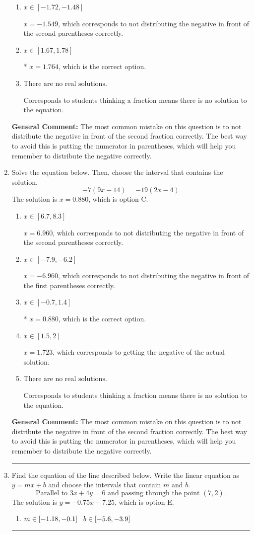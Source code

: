 \documentclass{extbook}[14pt]
\newcommand{\litem}[1]{\item #1

\rule{\textwidth}{0.4pt}}
\begin{document}
\begin{enumerate}
{\begin{enumerate}[label=\Alph*.]
$x = 1.354$, which corresponds to getting the negative of the actual solution.
\item \( x \in [-1.72, -1.48] \)

$x = -1.549$, which corresponds to not distributing the negative in front of the second parentheses correctly.
\item \( x \in [1.67, 1.78] \)

* $x = 1.764$, which is the correct option.
\item \( \text{There are no real solutions.} \)

Corresponds to students thinking a fraction means there is no solution to the equation.
\end{enumerate}

\textbf{General Comment:} The most common mistake on this question is to not distribute the negative in front of the second fraction correctly. The best way to avoid this is putting the numerator in parentheses, which will help you remember to distribute the negative correctly.
}
\litem{
Solve the equation below. Then, choose the interval that contains the solution.
\[ -7(9x -14) = -19(2x -4) \]The solution is \( x = 0.880 \), which is option C.\begin{enumerate}[label=\Alph*.]
\item \( x \in [6.7, 8.3] \)

$x = 6.960$, which corresponds to not distributing the negative in front of the second parentheses correctly.
\item \( x \in [-7.9, -6.2] \)

$x = -6.960$, which corresponds to not distributing the negative in front of the first parentheses correctly.
\item \( x \in [-0.7, 1.4] \)

* $x = 0.880$, which is the correct option.
\item \( x \in [1.5, 2] \)

$x = 1.723$, which corresponds to getting the negative of the actual solution.
\item \( \text{There are no real solutions.} \)

Corresponds to students thinking a fraction means there is no solution to the equation.
\end{enumerate}

\textbf{General Comment:} The most common mistake on this question is to not distribute the negative in front of the second fraction correctly. The best way to avoid this is putting the numerator in parentheses, which will help you remember to distribute the negative correctly.
}
\litem{
Find the equation of the line described below. Write the linear equation as $ y=mx+b $ and choose the intervals that contain $m$ and $b$.
\[ \text{Parallel to } 3 x + 4 y = 6 \text{ and passing through the point } (7, 2). \]The solution is \( y = -0.75x + 7.25 \), which is option E.\begin{enumerate}[label=\Alph*.]
\item \( m \in [-1.18, -0.1] \hspace*{3mm} b \in [-5.6, -3.9] \)


\end{enumerate}}
\end{enumerate}
\end{document}
